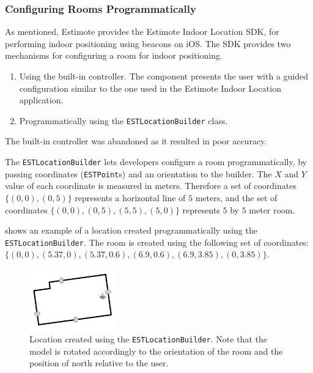 \subsubsection{Configuring Rooms Programmatically}
As mentioned, Estimote provides the Estimote Indoor Location SDK, 
for performing indoor positioning using beacons on iOS. 
The SDK provides two mechanisms for configuring a room for indoor positioning.

\begin{enumerate}
\item Using the built-in controller. The component presents the user with a guided configuration similar to the one used in the Estimote Indoor Location application.
\item Programmatically using the \texttt{ESTLocationBuilder} class.
\end{enumerate}

The built-in controller was abandoned as it resulted in poor accuracy.

The \texttt{ESTLocationBuilder} lets developers configure a room programmatically, 
by passing coordinates (\texttt{ESTPoint}s) and an orientation to the builder. 
The $X$ and $Y$ value of each coordinate is measured in meters. 
Therefore a set of coordinates $\{(0, 0), (0, 5)\}$ represents a horizontal line of $5$ meters, 
and the set of coordinates $\{(0,0),(0,5),(5,5),(5,0)\}$ represents $5$ by $5$ meter room.

 shows an example of a location created programmatically using the \texttt{ESTLocationBuilder}. The room is created using the following set of coordinates: $\{(0, 0), (5.37, 0), (5.37, 0.6), (6.9, 0.6), (6.9, 3.85), (0, 3.85)\}$.

\begin{figure}[!htb]
  \centering
  \includegraphics[width=0.33\textwidth]{images/living-room}
  \caption{Location created using the \texttt{ESTLocationBuilder}. Note that the model is rotated accordingly to the orientation of the room and the position of north relative to the user.}
  \label{fig:estlocationbuilder-livingroom}
\end{figure}

